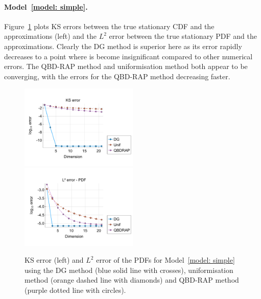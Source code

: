 \paragraph{Model~\ref{model: simple}.}
Figure~\ref{fig: reflecting stationary} plots KS errors between the true stationary CDF and the approximations (left) and the \(L^2\) error between the true stationary PDF and the approximations. Clearly the DG method is superior here as its error rapidly decreases to a point where is become insignificant compared to other numerical errors. The QBD-RAP method and uniformisation method both appear to be converging, with the errors for the QBD-RAP method decreasing faster.
\begin{figure}[h]
	\centering
	\includegraphics[width=0.5\textwidth,trim={0.75cm 0.8cm 0.25cm 1.25cm},clip]{chapter6/figs/hitting_times_model/reflecting_model/stationary_distribution/ks_error_formatted.pdf}%
	\includegraphics[width=0.5\textwidth,trim={0.75cm 0.8cm 0.25cm 1.25cm},clip]{chapter6/figs/hitting_times_model/reflecting_model/stationary_distribution/l2_pdf_error_formatted.pdf}
	\caption{KS error (left) and \(L^2\) error of the PDFs for Model~\ref{model: simple} using the DG method (blue solid line with crosses), uniformisation method (orange dashed line with diamonds) and QBD-RAP method (purple dotted line with circles).} 
	\label{fig: reflecting stationary} 
\end{figure}

\FloatBarrier
